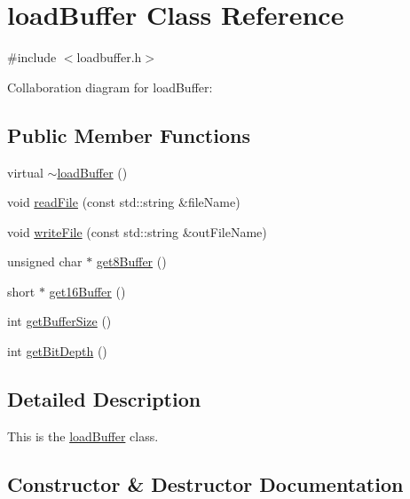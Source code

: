 \hypertarget{classloadBuffer}{}\section{load\+Buffer Class Reference}
\label{classloadBuffer}


{\ttfamily \#include $<$loadbuffer.\+h$>$}



Collaboration diagram for load\+Buffer\+:
\subsection*{Public Member Functions}
\begin{DoxyCompactItemize}
\item 
virtual \hyperlink{classloadBuffer_a569f285c4f37d2880c1619842d54917a}{$\sim$load\+Buffer} ()
\item 
void \hyperlink{classloadBuffer_adfdc981dd37280f382467ecd6fb087c6}{read\+File} (const std\+::string \&file\+Name)
\item 
void \hyperlink{classloadBuffer_a0ebc8576784119627232cff763100695}{write\+File} (const std\+::string \&out\+File\+Name)
\item 
unsigned char $\ast$ \hyperlink{classloadBuffer_ace04b355c2b23c72abd1d322dcb960ee}{get8\+Buffer} ()
\item 
short $\ast$ \hyperlink{classloadBuffer_aa6b14cb999de76cfce307f7036310859}{get16\+Buffer} ()
\item 
int \hyperlink{classloadBuffer_afdb86606188438cef499304c2a0af433}{get\+Buffer\+Size} ()
\item 
int \hyperlink{classloadBuffer_aa4d8b0a75f4459dc0f255f62d822e14b}{get\+Bit\+Depth} ()
\end{DoxyCompactItemize}


\subsection{Detailed Description}
This is the \hyperlink{classloadBuffer}{load\+Buffer} class. 

\subsection{Constructor \& Destructor Documentation}
\mbox{\label{classloadBuffer_a569f285c4f37d2880c1619842d54917a}} 
